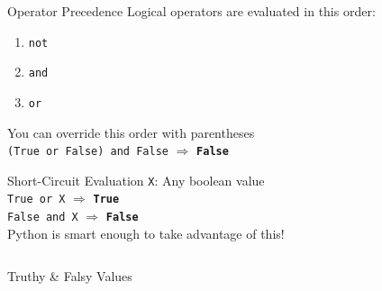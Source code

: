         \begin{frame}{Operator Precedence}
            \LARGE
            Logical operators are evaluated in this order:
            \begin{enumerate}
                \item \texttt{not}
                \item \texttt{and}
                \item \texttt{or}
            \end{enumerate}
            \pause
            \medskip
            You can override this order with parentheses\\
            \pause
            \smallskip
            \texttt{(True or False) and False} $\Rightarrow$ 
            \pause
            \textbf{\texttt{False}} \\
        \end{frame}

        \begin{frame}{Short-Circuit Evaluation}
            \LARGE
            \texttt{X}: Any boolean value\\
            \texttt{True or X} $\Rightarrow$ 
            \pause
            \textbf{\texttt{True}}\\
            \pause
            \texttt{False and X} $\Rightarrow$ 
            \pause
            \textbf{\texttt{False}}\\
            \pause
            Python is smart enough to take advantage of this!
            \pause
            \medskip
            \inputminted[frame=single,framesep=2pt]{python3}{code-examples/short_circuit.py}
        \end{frame}
        
        \begin{frame}{Truthy \& Falsy Values}
            \begin{columns}
                    \inputminted[firstline=1, lastline=8, frame=single,framesep=2pt]{python3}{code-examples/truthy-falsy.py}
                \pause
                    \inputminted[firstline=9, lastline=16, frame=single,framesep=2pt]{python3}{code-examples/truthy-falsy.py}
            \end{columns}
        \end{frame}

